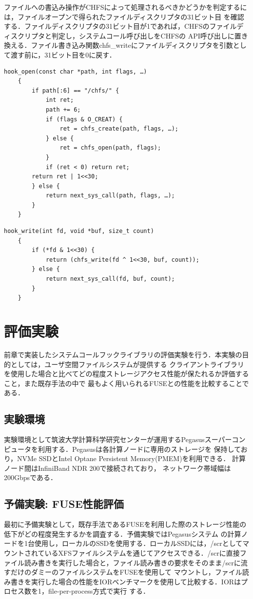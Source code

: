\documentclass[a4paper,11pt]{jreport}
\begin{document}
ファイルへの書込み操作がCHFSによって処理されるべきかどうかを判定するには，ファイルオープンで得られたファイルディスクリプタの31ビット目
を確認する．ファイルディスクリプタの31ビット目が1であれば，CHFSのファイルディスクリプタと判定し，システムコール呼び出しをCHFSの
API呼び出しに置き換える．ファイル書き込み関数chfs\_writeにファイルディスクリプタを引数として渡す前に，31ビット目を0に戻す．

\newpage

\begin{lstlisting}[caption=openシステムコールフック,label=open]
    hook_open(const char *path, int flags, …)
    {
        if path[:6] == "/chfs/" {
            int ret;
            path += 6;
            if (flags & O_CREAT) {
                ret = chfs_create(path, flags, …);
            } else {
                ret = chfs_open(path, flags);
            }
            if (ret < 0) return ret;
        return ret | 1<<30;
        } else {
            return next_sys_call(path, flags, …);
        }
    }
\end{lstlisting}

\begin{lstlisting}[caption=writeシステムコールフック,label=write]
    hook_write(int fd, void *buf, size_t count)
    {
        if (*fd & 1<<30) {
            return (chfs_write(fd ^ 1<<30, buf, count));
        } else {
            return next_sys_call(fd, buf, count);
        }
    }
\end{lstlisting}

\chapter{評価実験}
前章で実装したシステムコールフックライブラリの評価実験を行う．本実験の目的としては，ユーザ空間ファイルシステムが提供する
クライアントライブラリを使用した場合と比べてどの程度ストレージアクセス性能が保たれるか評価すること，また既存手法の中で
最もよく用いられるFUSEとの性能を比較することである．

\section{実験環境}
実験環境として筑波大学計算科学研究センターが運用するPegasusスーパーコンピュータを利用する．Pegasusは各計算ノードに専用のストレージを
保持しており，NVMe SSDとIntel Optane Persistent Memory(PMEM)を利用できる． 計算ノード間はInfiniBand NDR 200で接続されており，
ネットワーク帯域幅は200Gbpsである．
\section{予備実験: FUSE性能評価}
最初に予備実験として，既存手法であるFUSEを利用した際のストレージ性能の低下がどの程度発生するかを調査する．予備実験ではPegasusシステム
の計算ノードを1台使用し，ローカルのSSDを使用する．ローカルSSDには，/scrとしてマウントされているXFSファイルシステムを通じてアクセスできる．/scrに直接ファイル読み書きを実行した場合と，ファイル読み書きの要求をそのまま/scrに流すだけのダミーのファイルシステムをFUSEを使用して
マウントし，ファイル読み書きを実行した場合の性能をIORベンチマークを使用して比較する．IORはプロセス数を1，file-per-process方式で実行
する．
\end{document}
